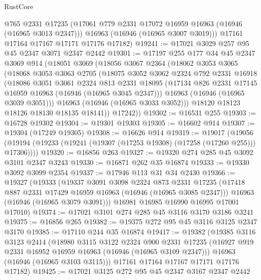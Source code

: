 \begin{lexlean}{RustCore}
\begin{coremodule}
        @765
        @2331
        @17235
        (@17061 @779 @2331 @17072 @16959 @16963 (@16946 (@16965 @3013 @2347)))
        @16963
        (@16946 (@16965 @3007 @3019)))
      @17161
      @17164
      @17167
      @17171
      @17176
      @17182)
@19241 := @17021 @3029 @257 @95 @45 @2347 @3071 @2347 @2442
@19301 := @17197
    @255
    @177
    @34
    @45
    @2347
    @3069
    @914
    (@18051
      @3069
      (@18056
        @3067
        @2364
        (@18062
          @3053
          @3065
          (@18068
            @3053
            @3063
            @2705
            (@18075
              @3052
              @3062
              @2324
              @792
              @2331
              @16918
              (@18086
                @3051
                @3061
                @2324
                @813
                @2331
                @18095
                (@17134 @826 @2331 @17145 @16959 @16963 (@16946 (@16965 @3045 @2347)))
                @16963
                (@16946 (@16965 @3039 @3051)))
              @16963
              (@16946 (@16965 @3033 @3052)))
            @18120
            @18123
            @18126
            @18130
            @18135
            @18141))
        @17242))
@19302 := @16531 @255
@19303 := @16728 @19302
@19304 := @19301 @19303
@19305 := @16602 @914
@19307 := @19304 (@17249 @19305)
@19308 := @16626 @914
@19319 := @19017
    (@19056 (@19194 (@19233 (@19241 (@19307 (@17253 @19308) (@17258 (@17260 @255))) @17306))))
@19320 := @16856 @263
@19327 := @19320 @274 @285 @45 @3092 @3101 @2347 @3243
@19330 := @16871 @262 @35 @16874
@19333 := @19330 @3092 @3099 @2354
@19337 := @17946 @113 @31 @34 @2430
@19366 := @19327
    (@19333
      (@19337
        @3091
        @3098
        @2324
        @873
        @2331
        @17235
        (@17418 @887 @2331 @17429 @16959 @16963 (@16946 (@16965 @3085 @2347)))
        @16963
        (@16946 (@16965 @3079 @3091)))
      @16981
      @16985
      @16990
      @16995
      @17001
      @17010)
@19374 := @17021 @3101 @274 @285 @45 @3116 @3170 @3186 @3241
@19375 := @16856 @265
@19382 := @19375 @272 @95 @45 @3116 @3125 @2347 @3170
@19385 := @17110 @244 @35 @16874
@19417 := @19382
    (@19385
      @3116
      @3123
      @2414
      (@18980
        @3115
        @3122
        @2324
        @900
        @2331
        @17235
        (@16927 @919 @2331 @16952 @16959 @16963 (@16946 (@16965 @3109 @2347)))
        @16963
        (@16946 (@16965 @3103 @3115)))
      @17161
      @17164
      @17167
      @17171
      @17176
      @17182)
@19425 := @17021 @3125 @272 @95 @45 @2347 @3167 @2347 @2442

\end{coremodule}
\end{lexlean}
